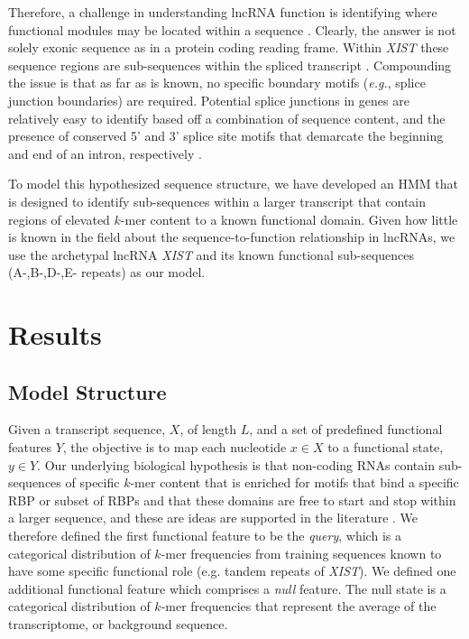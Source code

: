 Therefore, a challenge in understanding lncRNA function is identifying where functional modules may be located within a sequence \cite{Pang2006RapidFunction,Hezroni2015PrinciplesSpecies,Johnson2014TheRNAs}. Clearly, the answer is not solely exonic sequence as in a protein coding reading frame. Within \emph{XIST} these sequence regions are sub-sequences within the spliced transcript \cite{Brockdorff10TheNucleus.,Brown10TheNucleus.,Brockdorff2018LocalNcRNA,Sprague2019NonlinearDomains,Pintacuda2017HnRNPKSilencing,Hoki2009AMouse,Sunwoo2017RepeatCIZ1}. Compounding the issue is that as far as is known, no specific boundary motifs (\emph{e.g.}, splice junction boundaries) are required. Potential splice junctions in genes are relatively easy to identify based off a combination of sequence content, and the presence of conserved 5' and 3' splice site motifs that demarcate the beginning and end of an intron, respectively \cite{Burge1997PredictionDNA}. 

To model this hypothesized sequence structure, we have developed an HMM that is designed to identify sub-sequences within a larger transcript that contain regions of elevated $k$-mer content to a known functional domain. Given how little is known in the field about the sequence-to-function relationship in lncRNAs, we use the archetypal lncRNA \emph{XIST} and its known functional sub-sequences (A-,B-,D-,E- repeats) as our model. 
\section{Results}
\subsection{Model Structure}
Given a transcript sequence, $X$, of length $L$, and a set of predefined functional features $Y$, the objective is to map each nucleotide $x \in X$ to a functional state, $y \in Y$. Our underlying biological hypothesis is that non-coding RNAs contain sub-sequences of specific $k$-mer content that is enriched for motifs that bind a specific RBP or subset of RBPs and that these domains are free to start and stop within a larger sequence, and these are ideas are supported in the literature \cite{Brockdorff2018LocalNcRNA,Hezroni2015PrinciplesSpecies,Pang2006RapidFunction}. We therefore defined the first functional feature to be the \emph{query}, which is a categorical distribution of $k$-mer frequencies from training sequences known to have some specific functional role (e.g. tandem repeats of \emph{XIST}). We defined one additional functional feature which comprises a \emph{null} feature. The null state is a categorical distribution of $k$-mer frequencies that represent the average of the transcriptome, or background sequence. 

